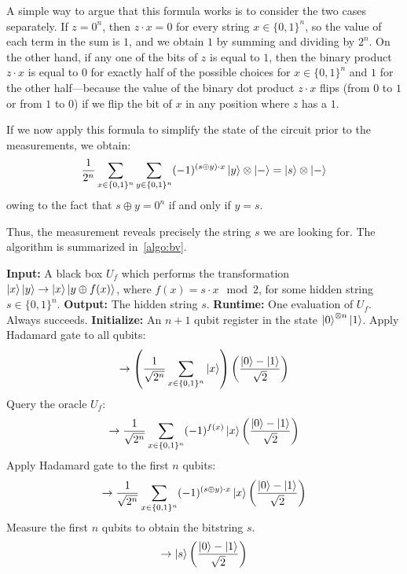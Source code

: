 A simple way to argue that this formula works is to consider the two cases separately. If $z = 0^n$, then $z \cdot x = 0$ for every string $x \in \{0,1\}^n$, so the value of each term in the sum is $1$, and we obtain $1$ by summing and dividing by $2^n$. On the other hand, if any one of the bits of $z$ is equal to $1$, then the binary product $z \cdot x$ is equal to $0$ for exactly half of the possible choices for $x \in \{0,1\}^n$ and $1$ for the other half—because the value of the binary dot product $z \cdot x$ flips (from $0$ to $1$ or from $1$ to $0$) if we flip the bit of $x$ in any position where $z$ has a $1$.

If we now apply this formula to simplify the state of the circuit prior to the measurements, we obtain:
\[
\frac{1}{2^n}\sum_{x\in\{0,1\}^n}\sum_{y\in\{0,1\}^n}(-1)^{(s\oplus y)\cdot x}\ket{y}\otimes\ket{-} = \ket{s}\otimes\ket{-}
\]
owing to the fact that $s \oplus y = 0^n$ if and only if $y = s$.

Thus, the measurement reveals precisely the string $s$ we are looking for. The algorithm is summarized in~\ref{algo:bv}.
\begin{algorithm}
    \caption{Bernstein–Vazirani Algorithm}
    \begin{algorithmic}[1]
    \State \textbf{Input:} A black box $U_f$ which performs the transformation $\ket{x}\ket{y} \rightarrow \ket{x}\ket{y \oplus f(x)}$, where $f(x) = s \cdot x \mod 2$, for some hidden string $s \in \{0,1\}^n$.
    \State \textbf{Output:} The hidden string $s$.
    \State \textbf{Runtime:} One evaluation of $U_f$. Always succeeds.
    \State \textbf{Initialize:} An $n+1$ qubit register in the state $\ket{0}^{\otimes n}\ket{1}$.
    \State Apply Hadamard gate to all qubits:
    \[
    \rightarrow \left( \frac{1}{\sqrt{2^n}} \sum_{x\in\{0,1\}^n} \ket{x} \right) \left( \frac{\ket{0} - \ket{1}}{\sqrt{2}} \right)
    \]
    \State Query the oracle $U_f$:
    \[
    \rightarrow \frac{1}{\sqrt{2^n}} \sum_{x\in\{0,1\}^n} (-1)^{f(x)} \ket{x} \left( \frac{\ket{0} - \ket{1}}{\sqrt{2}} \right)
    \]
    \State Apply Hadamard gate to the first $n$ qubits:
    \[
    \rightarrow \frac{1}{\sqrt{2^n}} \sum_{x\in\{0,1\}^n} (-1)^{(s\oplus y) \cdot x} \ket{x} \left( \frac{\ket{0} - \ket{1}}{\sqrt{2}} \right)
    \]
    \State Measure the first $n$ qubits to obtain the bitstring $s$.
    \[
    \rightarrow \ket{s} \left( \frac{\ket{0} - \ket{1}}{\sqrt{2}} \right)
    \]
    \end{algorithmic}
    \label{algo:bv}
\end{algorithm}


